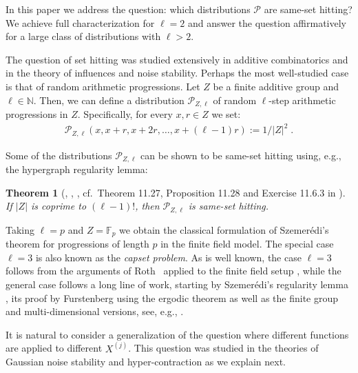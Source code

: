 \documentclass{daj}
\newcommand{\1}{\mathbbm{1}}
\theoremstyle{plain}
\newtheorem{theorem}{Theorem}[section]
\theoremstyle{definition}
\newcommand{\cP}{\mathcal{P}}
\begin{document}
In this paper we address the question: which distributions $\mathcal{P}$
are same-set hitting? We achieve full characterization for $\ell = 2$
and answer the question affirmatively for a large class of distributions
with $\ell > 2$.

The question of set hitting was studied extensively in additive combinatorics and in the theory of influences and noise stability. Perhaps the most well-studied case is that of random arithmetic progressions. Let $Z$ be a finite additive group
and $\ell \in \mathbb{N}$.
Then, we can define a distribution $\mathcal{P}_{Z,\ell}$ 
of random $\ell$-step arithmetic progressions in $Z$. 
Specifically, for every $x, r \in Z$ we set:
\begin{align*}
  \cP_{Z,\ell}(x, x+r, x+2r, \ldots, x+(\ell-1)r) := 1/|Z|^2 \; .
\end{align*}

Some of the distributions $\cP_{Z,\ell}$ can be shown to be
same-set hitting using, e.g., the hypergraph regularity lemma:
\begin{theorem}[\cite{RS04}, \cite{RS06}, \cite{Gow07}, cf.~Theorem 11.27,
Proposition 11.28 and Exercise 11.6.3 in \cite{TV06}]
\label{thm:progressions}
If $|Z|$ is coprime to $(\ell-1)!$, then $\cP_{Z,\ell}$ is same-set hitting.
\end{theorem}

Taking $\ell = p$ and $Z = \mathbb{F}_p$ we obtain the classical
formulation of Szemerédi's theorem for progressions of length $p$
in the finite field model. The special case $\ell = 3$ is also known
as the \emph{capset problem}.
As is well known, the case $\ell=3$ follows from the arguments of
Roth~\cite{Rot53} applied to the finite field setup \cite{Mes95},
while the general case
follows a long line of work, starting by Szemerédi's regularity lemma
\cite{Sze75}, its proof by Furstenberg using the ergodic theorem \cite{Fur77}
as well as the finite group and multi-dimensional versions, see, e.g.,
\cite{Rot53, FK91, Gow01, Green05}.

It is natural to consider a generalization of the question where different
functions are applied to different $X^{(j)}$. This question was studied in the
theories of Gaussian noise stability and hyper-contraction as we explain next.
\end{document}
